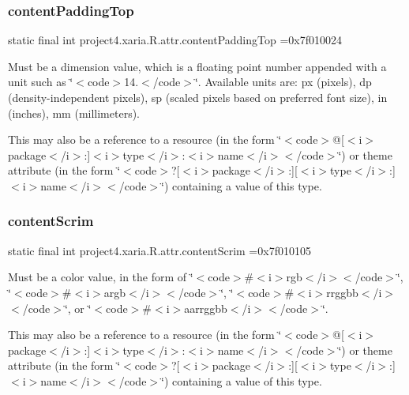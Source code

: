 \subsubsection{\texorpdfstring{content\+Padding\+Top}{contentPaddingTop}}
{\footnotesize\ttfamily static final int project4.\+xaria.\+R.\+attr.\+content\+Padding\+Top =0x7f010024\hspace{0.3cm}{\ttfamily [static]}}

Must be a dimension value, which is a floating point number appended with a unit such as \char`\"{}$<$code$>$14.\+5sp$<$/code$>$\char`\"{}. Available units are\+: px (pixels), dp (density-\/independent pixels), sp (scaled pixels based on preferred font size), in (inches), mm (millimeters). 

This may also be a reference to a resource (in the form \char`\"{}$<$code$>$@\mbox{[}$<$i$>$package$<$/i$>$\+:\mbox{]}$<$i$>$type$<$/i$>$\+:$<$i$>$name$<$/i$>$$<$/code$>$\char`\"{}) or theme attribute (in the form \char`\"{}$<$code$>$?\mbox{[}$<$i$>$package$<$/i$>$\+:\mbox{]}\mbox{[}$<$i$>$type$<$/i$>$\+:\mbox{]}$<$i$>$name$<$/i$>$$<$/code$>$\char`\"{}) containing a value of this type. \mbox{\label{classproject4_1_1xaria_1_1R_1_1attr_af20588b6e66abc96455fe0a66d44de43}} 
\subsubsection{\texorpdfstring{content\+Scrim}{contentScrim}}
{\footnotesize\ttfamily static final int project4.\+xaria.\+R.\+attr.\+content\+Scrim =0x7f010105\hspace{0.3cm}{\ttfamily [static]}}

Must be a color value, in the form of \char`\"{}$<$code$>$\#$<$i$>$rgb$<$/i$>$$<$/code$>$\char`\"{}, \char`\"{}$<$code$>$\#$<$i$>$argb$<$/i$>$$<$/code$>$\char`\"{}, \char`\"{}$<$code$>$\#$<$i$>$rrggbb$<$/i$>$$<$/code$>$\char`\"{}, or \char`\"{}$<$code$>$\#$<$i$>$aarrggbb$<$/i$>$$<$/code$>$\char`\"{}. 

This may also be a reference to a resource (in the form \char`\"{}$<$code$>$@\mbox{[}$<$i$>$package$<$/i$>$\+:\mbox{]}$<$i$>$type$<$/i$>$\+:$<$i$>$name$<$/i$>$$<$/code$>$\char`\"{}) or theme attribute (in the form \char`\"{}$<$code$>$?\mbox{[}$<$i$>$package$<$/i$>$\+:\mbox{]}\mbox{[}$<$i$>$type$<$/i$>$\+:\mbox{]}$<$i$>$name$<$/i$>$$<$/code$>$\char`\"{}) containing a value of this type. \mbox{\label{classproject4_1_1xaria_1_1R_1_1attr_a0378bff04031fc46fbbfef67270646dd}} 
